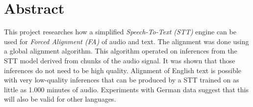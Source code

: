 \section*{Abstract}

This project researches how a simplified \textit{Speech-To-Text (STT)} engine can be used for \textit{Forced Alignment (FA)} of audio and text. The alignment was done using a global alignment algorithm. This algorithm operated on inferences from the STT model derived from chunks of the audio signal. It was shown that those inferences do not need to be high quality. Alignment of English text is possible with very low-quality inferences that can be produced by a STT trained on as little as 1.000 minutes of audio. Experiments with German data suggest that this will also be valid for other languages.